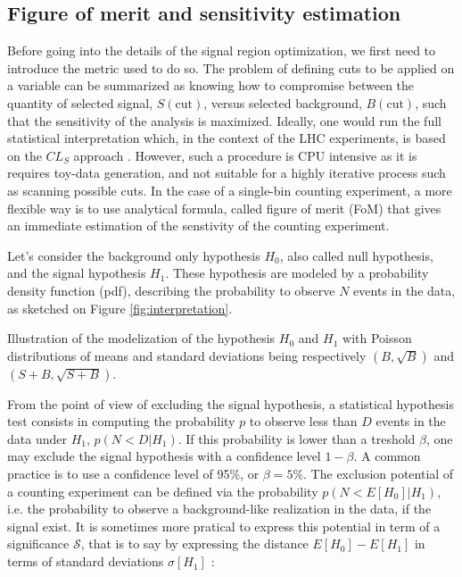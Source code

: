             \subsection{Figure of merit and sensitivity estimation}

    Before going into the details of the signal region optimization, we first need to 
    introduce the metric used to do so. The problem of defining cuts to be applied on a 
    variable can be summarized as knowing how to compromise between the quantity of 
    selected signal, $S(\text{cut})$, versus selected background, $B(\text{cut})$, such 
    that the sensitivity of the analysis is maximized. Ideally, one would run the full 
    statistical interpretation which, in the context of the LHC experiments, is based
    on the $CL_S$ approach . However, such a procedure is CPU intensive as it is 
    requires toy-data generation, and not suitable for a highly iterative process such 
    as scanning possible cuts. In the case of a single-bin counting experiment, a more 
    flexible way is to use analytical formula, called figure of merit (FoM) that gives an
    immediate estimation of the senstivity of the counting experiment.

    Let's consider the background only hypothesis $H_0$, also called null hypothesis, 
    and the signal hypothesis $H_1$. These hypothesis are modeled by a probability density
    function (pdf), describing the probability to observe $N$ events in the data, as 
    sketched on Figure \ref{fig:interpretation}.
           
                 {Illustration of the modelization of the hypothesis $H_0$ and $H_1$ with
                 Poisson distributions of means and standard deviations being respectively 
                 $(B,\sqrt{B})$ and $(S+B,\sqrt{S+B})$. }

    From the point of view of excluding the signal hypothesis, a statistical hypothesis
    test consists in computing the probability $p$ to observe less than $D$ events in the 
    data under $H_1$, $p(N < D|H_1)$. If this probability is lower than a treshold 
    $\beta$, one may exclude the signal hypothesis with a confidence level $1-\beta$. A 
    common practice is to use a confidence level of 95\%, or $\beta = 5\%$. The exclusion 
    potential of a counting experiment can be defined via the probability $p(N < E[H_0]|H_1)$, 
    i.e. the probability to observe a background-like realization in the data, if the 
    signal exist. It is sometimes more pratical to express this potential in term of a 
    significance $\mathcal{S}$, that is to say by expressing the distance $E[H_0] - 
    E[H_1]$ in terms of standard deviations $\sigma[H_1]$ :
    
